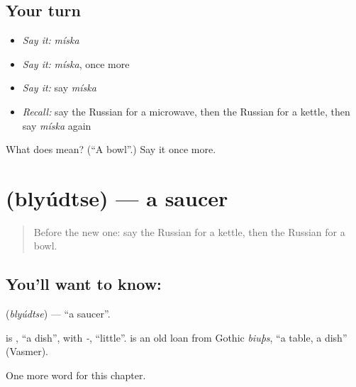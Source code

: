 \subsection*{Your turn}
\begin{itemize}
\raggedright
  \item \emph{Say it:} \emph{míska}
  \item \emph{Say it:} \emph{míska}, once more
  \item \emph{Say it:} say \emph{míska}
  \item \emph{Recall:} say the Russian for a microwave, then the Russian for a kettle, then say \emph{míska} again
\end{itemize}

\begin{tcolorbox}[breakable,colback=teal!4,colframe=teal!35!black,title={Before you move on}]
What does  mean? (\textquotedblleft{}A bowl\textquotedblright{}.) Say it once more.
\end{tcolorbox}
\section[\texorpdfstring{\ru{блюдце} (blyúdtse)}{блюдце (blyúdtse)}]{ (blyúdtse) — a saucer}

\label{lesson:RU-C246-blyudtse}



\begin{quote}
Before the new one: say the Russian for a kettle, then the Russian for a bowl.
\end{quote}

\subsection*{You'll want to know: }
\textbf{} (\emph{blyúdtse}) — \textquotedblleft{}a saucer\textquotedblright{}.

\begin{cousinweb}
\textbf{} is \emph{}, \textquotedblleft{}a dish\textquotedblright{}, with \emph{-}, \textquotedblleft{}little\textquotedblright{}. \emph{} is an old loan from Gothic \emph{biuþs}, \textquotedblleft{}a table, a dish\textquotedblright{} (Vasmer).
\end{cousinweb}

\begin{grammarlens}[title={What you've built}]
One more word for this chapter.
\end{grammarlens}

